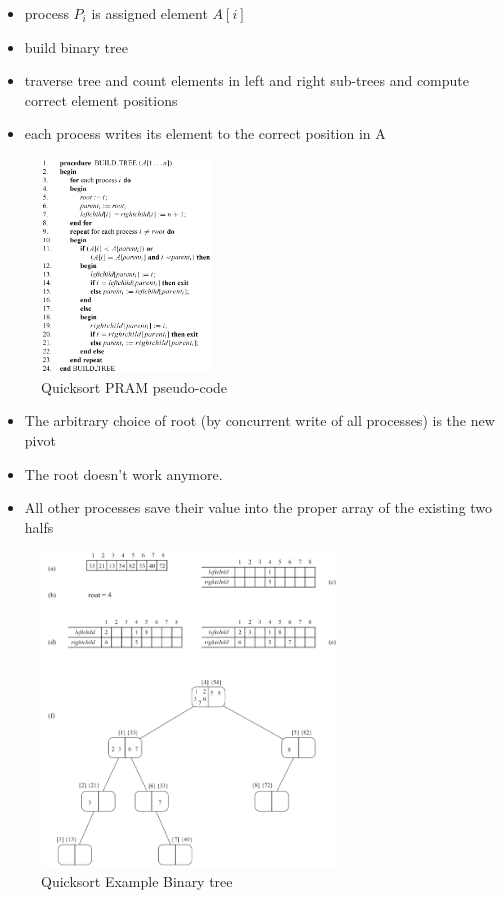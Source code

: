 \begin{itemize}
\tightlist
\item
  process $P_i$ is assigned element $A[i]$
\item
  build binary tree
\item
  traverse tree and count elements in left and right sub-trees and
  compute correct element positions
\item
  each process writes its element to the correct position in A
\end{itemize}

\begin{figure}[H]
\centering
\includegraphics[width=0.4\textwidth]{figures/quicksortPRAM.png}
\caption{Quicksort PRAM pseudo-code}
\end{figure}

\begin{itemize}
\tightlist
\item
  The arbitrary choice of root (by concurrent write of all processes) is
  the new pivot
\item
  The root doesn't work anymore.
\item
  All other processes save their value into the proper array of the
  existing two halfs
\end{itemize}

\begin{figure}[H]
\centering
\includegraphics[width=0.7\textwidth]{figures/binarytreeQuicksortExample.png}
\caption{Quicksort Example Binary tree}
\end{figure}

